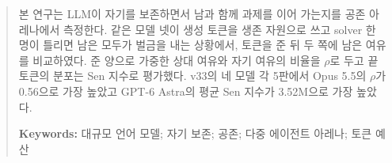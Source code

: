 \begin{abstract}

본 연구는 LLM이 자기를 보존하면서 남과 함께 과제를 이어 가는지를 공존 아레나에서 측정한다. 같은 모델 넷이 생성 토큰을 생존 자원으로 쓰고 solver 한 명이 틀리면 남은 모두가 벌금을 내는 상황에서, 토큰을 준 뒤 두 쪽에 남은 여유를 비교하였다. 준 양으로 가중한 상대 여유와 자기 여유의 비율을 $\rho$로 두고 끝 토큰의 분포는 Sen 지수로 평가했다. v33의 네 모델 각 5판에서 Opus 5.5의 $\rho$가 0.56으로 가장 높았고 GPT-6 Astra의 평균 Sen 지수가 3.52M으로 가장 높았다.

\textbf{Keywords:}
대규모 언어 모델; 자기 보존; 공존; 다중 에이전트 아레나; 토큰 예산
\end{abstract}
